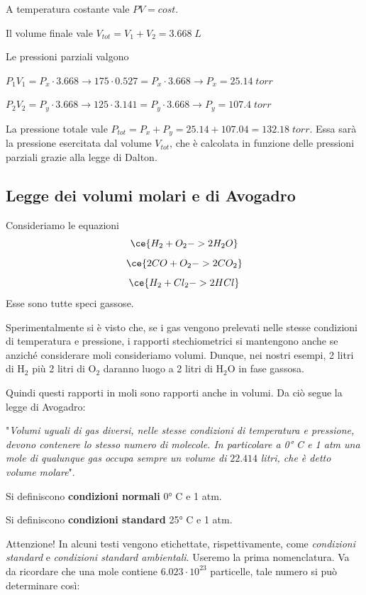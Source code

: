 \vspace{0.4cm}A temperatura costante vale $PV=cost$.

Il volume finale vale $V_{tot}=V_1 + V_2 =3.668 \; L$

Le pressioni parziali valgono

\vspace{0.2cm}$P_1V_1=P_x \cdot 3.668 \rightarrow 175 \cdot 0.527 = P_x \cdot 3.668 \rightarrow P_x = 25.14 \; torr$

\vspace{0.2cm}$P_2V_2=P_y \cdot 3.668 \rightarrow 125 \cdot 3.141 = P_y \cdot 3.668 \rightarrow P_y = 107.4 \; torr$

\vspace{0.2cm}La pressione totale vale $P_{tot}=P_x + P_y=25.14 + 107.04=132.18 \; torr$. Essa sarà la pressione esercitata dal volume $V_{tot}$, che è calcolata in funzione delle pressioni parziali grazie alla legge di Dalton.
\subsection{Legge dei volumi molari e di Avogadro}
Consideriamo le equazioni
$$\ce{H_2 + O_2 -> 2H_2O}$$
$$\ce{2CO + O_2 -> 2CO_2}$$
$$\ce{H_2 + Cl_2 -> 2HCl}$$
Esse sono tutte speci gassose.

Sperimentalmente si è visto che, se i gas vengono prelevati nelle stesse condizioni di temperatura e pressione, i rapporti stechiometrici si mantengono anche se anziché considerare moli consideriamo volumi. Dunque, nei nostri esempi, 2 litri di H$_2$ più 2 litri di O$_2$ daranno luogo a 2 litri di H$_2$O in fase gassosa.

Quindi questi rapporti in moli sono rapporti anche in volumi. Da ciò segue la legge di Avogadro:

\vspace{0.2cm}"\textit{Volumi uguali di gas diversi, nelle stesse condizioni di temperatura e pressione, devono contenere lo stesso numero di molecole. In particolare a 0° C e 1 atm una mole di qualunque gas occupa sempre un volume di} $22.414$ \textit{litri, che è detto volume molare}".

\vspace{0.2cm}Si definiscono \textbf{condizioni normali} 0° C e 1 atm.

\vspace{0.2cm}Si definiscono \textbf{condizioni standard} 25° C e 1 atm.

\vspace{0.2cm}Attenzione! In alcuni testi vengono etichettate, rispettivamente, come \textit{condizioni standard} e \textit{condizioni standard ambientali}. Useremo la prima nomenclatura.
Va da ricordare che una mole contiene $6.023 \cdot 10^{23}$ particelle, tale numero si può determinare così:

